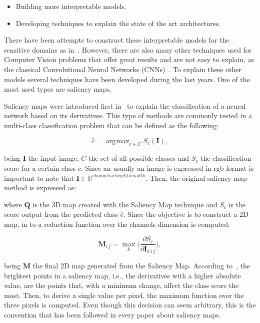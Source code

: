 \documentclass[preprint,12pt]{elsarticle}
\DeclareMathOperator*{\argmax}{arg\!max}
\begin{document}
\begin{itemize}
    \item Building more interpretable models.
    \item Developing techniques to explain the state of the art architectures.
\end{itemize}

There have been attempts to construct these interpretable models for the sensitive domains as in~\cite{singhThinkPositiveInterpretable2022}. However, there are also many other techniques used for Computer Vision problems that offer great results and are not easy to explain, as the classical Convolutional Neural Networks (CNNs)~\cite{lecunConvolutionalNetworksImages}. To explain these other models  several techniques have been developed during the last years. One of the most used types are saliency maps.

Saliency maps were introduced first in~\cite{simonyanDeepConvolutionalNetworks2014} to explain the classification of a neural network based on its derivatives. This type of methods are commonly tested in a multi-class classification problem that can be defined as the following:

\begin{equation}
    \label{eq: cnn output}
    \hat{c} = \argmax_{c \in C}S_c(\boldsymbol{I}),
\end{equation}

\noindent
being $\boldsymbol{I}$ the input image, $C$ the set of all possible classes and $S_c$ the classification score for a certain class $c$. Since an usually an image is expressed in rgb format is important to note that $\boldsymbol{I} \in \mathbb{R}^{\text{channels}\, x\, \text{height}\, x\, \text{width}}$. Then, the original saliency map method is expressed as:

\noindent
where $\boldsymbol{Q}$ is the 3D map created with the Saliency Map technique and $S_{\hat{c}}$ is the score output from the predicted class $\hat{c}$. Since the objective is to construct a 2D map, in \cite{simonyanDeepConvolutionalNetworks2014} to a reduction function over the channels dimension is computed:

\begin{equation}
    \label{eq: 3d saliency map}
    \boldsymbol{M}_{i\, j} = \max_{k} \bigg ( \frac{\partial S_{\hat{c}}}{\partial \boldsymbol{I}_{k\, i\, j}} \bigg ),
\end{equation}

being $\boldsymbol{M}$ the final 2D map generated from the Saliency Map. According to~\cite{simonyanDeepConvolutionalNetworks2014}, the brightest points in a saliency map, i.e., the derivatives with a higher absolute value, are the points that, with a minimum change, affect the class score the most. Then, to derive a single value per pixel, the maximum function over the three pixels is computed. Even though this decision can seem arbitrary, this is the convention that has been followed in every paper about saliency maps.
\end{document}
